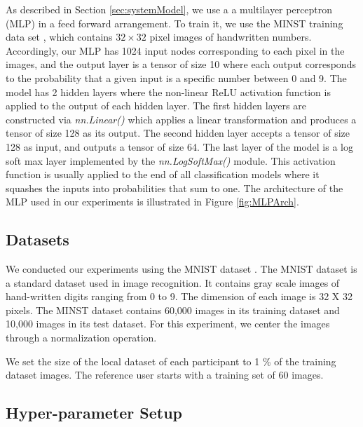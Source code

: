 \documentclass[letterpaper]{article}
\begin{document}
\begin{flushleft}
{As described in Section \ref{sec:systemModel}, we use a 
a multilayer perceptron (MLP) in a feed forward arrangement. To train it, we use the MINST training data set \cite{deng2012mnist}, which contains 
$32\times 32$ pixel images of handwritten numbers. Accordingly, our MLP has 1024 input nodes
corresponding to each pixel in the images, and the output layer is a tensor of size 10 where each output corresponds to the probability
that a given input is a specific number
between 0 and 9.  The model has 2 hidden layers where the non-linear ReLU activation function is applied to the
output of each hidden layer.  The first hidden layers are constructed via \textit{nn.Linear()} which applies a linear transformation
and produces a tensor of size 128 as its output. The second hidden layer accepts a tensor of size 128 as input, and outputs a tensor of
size 64. The last layer of the model is a log soft max layer implemented by the \textit{nn.LogSoftMax()} module.  This activation
function is usually applied to the end of all classification models where it squashes the inputs into probabilities that sum to one.
The architecture of the MLP used in our experiments is illustrated in Figure  \ref{fig:MLPArch}.



\subsection{Datasets}
We conducted our experiments using the MNIST dataset \cite{deng2012mnist}. The MNIST dataset is a standard dataset used in image
recognition. It contains gray scale images of hand-written digits ranging from 0 to 9. The dimension of each image is 32 X 32 pixels.
The MINST dataset contains 60,000 images in its training dataset and 10,000 images in its test dataset.
For this experiment, we center the images through a normalization operation.  

We set the size of the local dataset of each participant to 1 \% of the training dataset images.  The reference user starts with a
training set of 60 images.


\subsection{Hyper-parameter Setup}

}
\end{flushleft}
\end{document}
